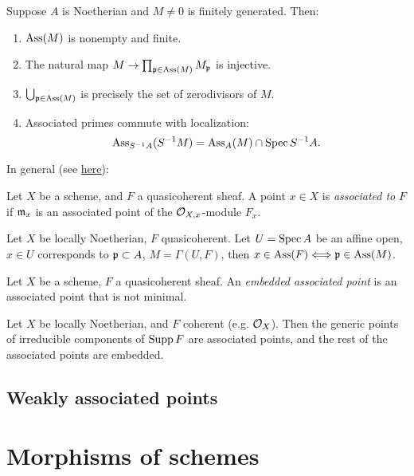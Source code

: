 \documentclass[11pt]{amsart}
\begin{document}
\begin{thm}
    Suppose $A$ is Noetherian and $M\neq 0$ is finitely generated. Then:
    \begin{enumerate}
        \item $\operatorname{Ass}(M)$ is nonempty and finite.
        \item The natural map $M\to \prod_{\mathfrak{p}\in \operatorname{Ass}(M)} M_{\mathfrak{p}}$ is injective.
        \item $\bigcup_{\mathfrak{p}\in \operatorname{Ass}(M)}$ is precisely the set of zerodivisors of $M$.
        \item Associated primes commute with localization:
        \[\operatorname{Ass}_{S^{-1}A}(S^{-1}M) = \operatorname{Ass}_A(M)\cap \operatorname{Spec} S^{-1}A.\]
    \end{enumerate}
\end{thm}

In general (see \href{https://stacks.math.columbia.edu/tag/02OI}{here}): 

\begin{defn}
    Let $X$ be a scheme, and $F$ a quasicoherent sheaf. A point $x\in X$ is \emph{associated to} $F$ if $\mathfrak{m}_x$ is an associated point of the $\mathcal{O}_{X,x}$-module $F_x$.
\end{defn}

\begin{prop}
    Let $X$ be locally Noetherian, $F$ quasicoherent. Let $U = \operatorname{Spec} A$ be an affine open, $x \in U$ corresponds to $\mathfrak{p}\subset A$, $M = \Gamma(U, F)$, then $x\in \operatorname{Ass}(F) \Longleftrightarrow \mathfrak{p}\in \operatorname{Ass}(M)$.
\end{prop}

\begin{defn}
    Let $X$ be a scheme, $F$ a quasicoherent sheaf. An \emph{embedded associated point} is an associated point that is not minimal. 
\end{defn}

\begin{prop}
    Let $X$ be locally Noetherian, and $F$ coherent (e.g. $\mathcal{O}_X$). Then the generic points of irreducible components of $\operatorname{Supp} F$ are associated points, and the rest of the associated points are embedded.
\end{prop}


\subsection{Weakly associated points}




\section{Morphisms of schemes}
\end{document}
